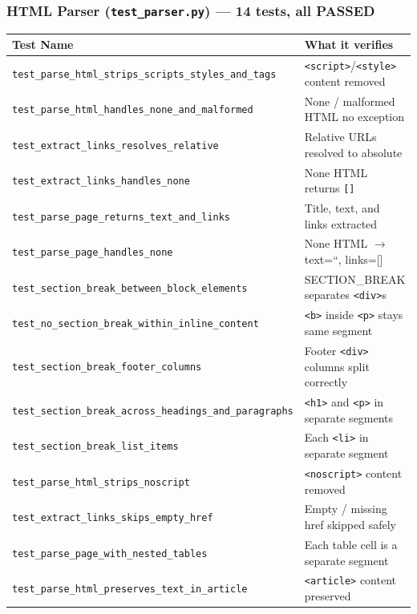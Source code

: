 \documentclass[12pt]{article}
\begin{document}
\subsubsection*{HTML Parser (\texttt{test\_parser.py}) --- 14 tests, all PASSED}
\begin{table}[H]
\centering
\footnotesize
\begin{tabular}{|p{7.2cm}|p{7.2cm}|}
\hline
\textbf{Test Name} & \textbf{What it verifies} \\
\hline
\texttt{test\_parse\_html\_strips\_scripts\_styles\_and\_tags} & \texttt{<script>}/\texttt{<style>} content removed \\
\texttt{test\_parse\_html\_handles\_none\_and\_malformed}       & None / malformed HTML no exception \\
\texttt{test\_extract\_links\_resolves\_relative}               & Relative URLs resolved to absolute \\
\texttt{test\_extract\_links\_handles\_none}                    & None HTML returns \texttt{[]} \\
\texttt{test\_parse\_page\_returns\_text\_and\_links}           & Title, text, and links extracted \\
\texttt{test\_parse\_page\_handles\_none}                       & None HTML $\to$ text=``, links=[] \\
\texttt{test\_section\_break\_between\_block\_elements}         & SECTION\_BREAK separates \texttt{<div>}s \\
\texttt{test\_no\_section\_break\_within\_inline\_content}      & \texttt{<b>} inside \texttt{<p>} stays same segment \\
\texttt{test\_section\_break\_footer\_columns}                  & Footer \texttt{<div>} columns split correctly \\
\texttt{test\_section\_break\_across\_headings\_and\_paragraphs} & \texttt{<h1>} and \texttt{<p>} in separate segments \\
\texttt{test\_section\_break\_list\_items}                      & Each \texttt{<li>} in separate segment \\
\texttt{test\_parse\_html\_strips\_noscript}                    & \texttt{<noscript>} content removed \\
\texttt{test\_extract\_links\_skips\_empty\_href}               & Empty / missing href skipped safely \\
\texttt{test\_parse\_page\_with\_nested\_tables}                & Each table cell is a separate segment \\
\texttt{test\_parse\_html\_preserves\_text\_in\_article}        & \texttt{<article>} content preserved \\
\hline
\end{tabular}
\end{table}
\end{document}

